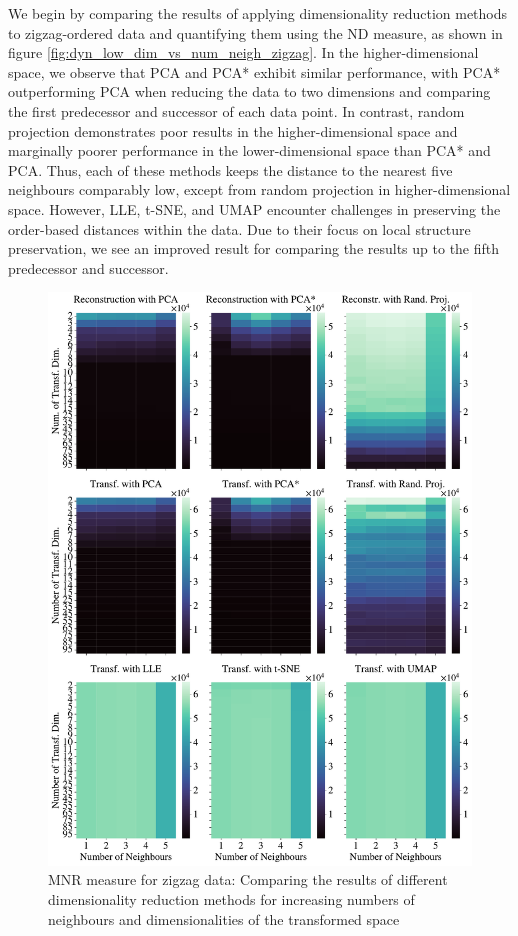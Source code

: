 \documentclass[pdftex,12pt,a4paper]{report}
\begin{document}
We begin by comparing the results of applying dimensionality reduction methods to zigzag-ordered data and quantifying them using the ND measure, as shown in figure \ref{fig:dyn_low_dim_vs_num_neigh_zigzag}.
In the higher-dimensional space, we observe that PCA and PCA* exhibit similar performance, with PCA* outperforming PCA when reducing the data to two dimensions and comparing the first predecessor and successor of each data point.
In contrast, random projection demonstrates poor results in the higher-dimensional space and marginally poorer performance in the lower-dimensional space than PCA* and PCA.
Thus, each of these methods keeps the distance to the nearest five neighbours comparably low, except from random projection in higher-dimensional space.
However, LLE, t-SNE, and UMAP encounter challenges in preserving the order-based distances within the data.
Due to their focus on local structure preservation, we see an improved result for comparing the results up to the fifth predecessor and successor.


\begin{figure}[htb!]
    \includegraphics*[width= \textwidth]{images/multiple_runs/zigzag/dyn_low_dim_vs_num_neigh/multiple_scalar_product/all_methods_10runs_5lines_100points_5neighbours.pdf}
    \caption{MNR measure for zigzag data: Comparing the results of different dimensionality reduction methods for increasing numbers of neighbours and dimensionalities of the transformed space} \label{fig:dyn_low_dim_vs_num_neigh_zigzag_scal}
\end{figure}
\end{document}
